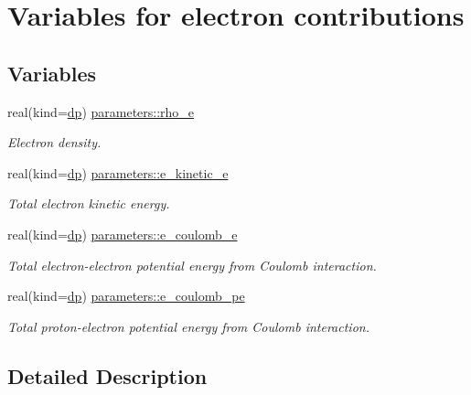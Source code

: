 \hypertarget{group__ELECTRONS}{}\section{Variables for electron contributions}
\label{group__ELECTRONS}
\subsection*{Variables}
\begin{DoxyCompactItemize}
\item 
real(kind=\mbox{\hyperlink{namespaceparameters_a52f8c6351fd79345d8811e065bcbbb37}{dp}}) \mbox{\hyperlink{group__ELECTRONS_ga395bd413249aeecf9cdbad4ff0740d03}{parameters\+::rho\+\_\+e}}
\begin{DoxyCompactList}\small\item\em Electron density. \end{DoxyCompactList}\item 
real(kind=\mbox{\hyperlink{namespaceparameters_a52f8c6351fd79345d8811e065bcbbb37}{dp}}) \mbox{\hyperlink{group__ELECTRONS_ga3fd2374e88574f66a4a05db80b0c045b}{parameters\+::e\+\_\+kinetic\+\_\+e}}
\begin{DoxyCompactList}\small\item\em Total electron kinetic energy. \end{DoxyCompactList}\item 
real(kind=\mbox{\hyperlink{namespaceparameters_a52f8c6351fd79345d8811e065bcbbb37}{dp}}) \mbox{\hyperlink{group__ELECTRONS_gae8693f5e86170e1a2d3e4a4f7dc81c37}{parameters\+::e\+\_\+coulomb\+\_\+e}}
\begin{DoxyCompactList}\small\item\em Total electron-\/electron potential energy from Coulomb interaction. \end{DoxyCompactList}\item 
real(kind=\mbox{\hyperlink{namespaceparameters_a52f8c6351fd79345d8811e065bcbbb37}{dp}}) \mbox{\hyperlink{group__ELECTRONS_ga62c8de947854059418c7f8c8e5cd9458}{parameters\+::e\+\_\+coulomb\+\_\+pe}}
\begin{DoxyCompactList}\small\item\em Total proton-\/electron potential energy from Coulomb interaction. \end{DoxyCompactList}\end{DoxyCompactItemize}


\subsection{Detailed Description}


